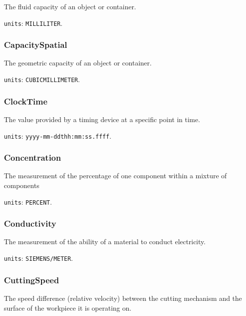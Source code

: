 The fluid capacity of an object or container.


\texttt{units}: \texttt{MILLILITER}.


\subsubsection{CapacitySpatial}
\label{sec:CapacitySpatial}



The geometric capacity of an object or container.


\texttt{units}: \texttt{CUBIC\textunderscore MILLIMETER}.


\subsubsection{ClockTime}
\label{sec:ClockTime}



The value provided by a timing device at a specific point in time.


\texttt{units}: \texttt{yyyy-mm-ddthh:mm:ss.ffff}.


\subsubsection{Concentration}
\label{sec:Concentration}



The measurement of the percentage of one component within a mixture of components


\texttt{units}: \texttt{PERCENT}.


\subsubsection{Conductivity}
\label{sec:Conductivity}



The measurement of the ability of a material to conduct electricity.


\texttt{units}: \texttt{SIEMENS/METER}.


\subsubsection{CuttingSpeed}
\label{sec:CuttingSpeed}



The speed difference (relative velocity) between the cutting mechanism and the surface of the workpiece it is operating on.


